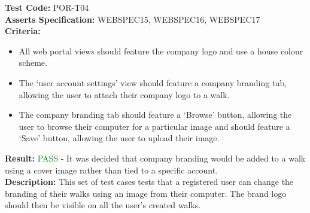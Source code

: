 \documentclass[11pt,a4paper]{report}
\begin{document}
\label{test:POR-T04}
\noindent\textbf{Test Code:} POR-T04\\
\textbf{Asserts Specification:} WEBSPEC15, WEBSPEC16, WEBSPEC17 \\ 
\textbf{Criteria:} \begin{itemize}
                     \item All web portal views should feature the company logo and use a house colour scheme.
                     \item The `user account settings' view should feature a company branding tab, allowing the user to attach their company logo to a walk.
                     \item The company branding tab should feature a `Browse' button, allowing the user to browse their computer for a particular image and should feature a `Save' button, allowing the user to upload their image.
                   \end{itemize}  
\textbf{Result:} \textcolor{green}{PASS} - It was decided that company branding would be added to a walk using a cover image rather than tied to a specific account.\\ 
\textbf{Description:} This set of test cases tests that a registered user can change the branding of their walks using an image from their computer. The brand logo should then be visible on all the user's created walks. \\
\end{document}
